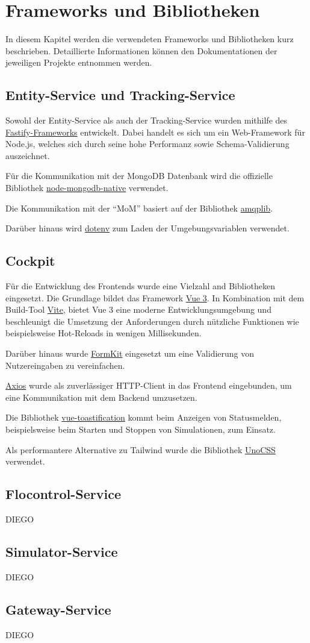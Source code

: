 \section{Frameworks und Bibliotheken}

In diesem Kapitel werden die verwendeten Frameworks und Bibliotheken kurz beschrieben.
Detaillierte Informationen können den Dokumentationen der jeweiligen Projekte entnommen werden.

\subsection{Entity-Service und Tracking-Service}

Sowohl der Entity-Service als auch der Tracking-Service wurden mithilfe des \href{https://www.fastify.io}{Fastify-Frameworks} entwickelt.
Dabei handelt es sich um ein Web-Framework für Node.js, welches sich durch seine hohe Performanz sowie Schema-Vali\-dierung auszeichnet.

Für die Kommunikation mit der MongoDB Datenbank wird die offizielle Bibliothek \href{https://github.com/mongodb/node-mongodb-native}{node-mongodb-native} verwendet.

Die Kommunikation mit der \enquote{MoM} basiert auf der Bibliothek \href{https://amqp-node.github.io/amqplib/}{amqplib}.

Darüber hinaus wird \href{https://github.com/motdotla/dotenv}{dotenv} zum Laden der Umgebungsvariablen verwendet.

\subsection{Cockpit}

Für die Entwicklung des Frontends wurde eine Vielzahl and Bibliotheken eingesetzt.
Die Grundlage bildet das Framework \href{https://vuejs.org}{Vue 3}.
In Kombination mit dem Build-Tool \href{https://vitejs.dev}{Vite}, bietet Vue 3 eine moderne Entwicklungsumgebung und beschleunigt die Umsetzung der Anforderungen durch nützliche Funktionen wie beispielsweise Hot-Reloads in wenigen Millisekunden.

Darüber hinaus wurde \href{https://formkit.com}{FormKit} eingesetzt um eine Validierung von Nutzereingaben zu vereinfachen.

\href{https://github.com/axios/axios}{Axios} wurde als zuverlässiger HTTP-Client in das Frontend eingebunden, um eine Kommunikation mit dem Backend umzusetzen.

Die Bibliothek \href{https://github.com/Maronato/vue-toastification}{vue-toastification} kommt beim Anzeigen von Statusmelden, beispielsweise beim Starten und Stoppen von Simulationen, zum Einsatz.

Als performantere Alternative zu Tailwind wurde die Bibliothek \href{https://uno.antfu.me}{UnoCSS} verwendet.

\subsection{Flocontrol-Service}
DIEGO

\subsection{Simulator-Service}
DIEGO

\subsection{Gateway-Service}
DIEGO
